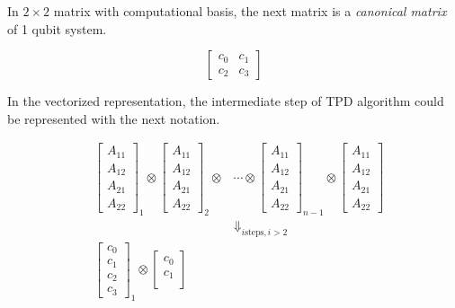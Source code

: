 \documentclass[twocolumn]{article}
\begin{document}
In $2 \times 2$ matrix with computational basis, the next matrix is a \textit{canonical matrix} of 1 qubit system.

\begin{equation}
    \begin{bmatrix}
        c_0 & c_1\\
        c_2 & c_3
    \end{bmatrix}
\end{equation}

In the vectorized representation, the intermediate step of TPD algorithm 
could be represented with the next notation. 

\begin{eqnarray}
    &\begin{bmatrix}
        A_{11} \\
        A_{12} \\
        A_{21} \\
        A_{22}
    \end{bmatrix}_1 \otimes
    \begin{bmatrix}
        A_{11} \\
        A_{12} \\
        A_{21} \\
        A_{22}
    \end{bmatrix}_2 \otimes
    &\cdots \otimes
    \begin{bmatrix}
        A_{11} \\
        A_{12} \\
        A_{21} \\
        A_{22}
    \end{bmatrix}_{n-1} \otimes
    \begin{bmatrix}
        A_{11} \\
        A_{12} \\
        A_{21} \\
        A_{22}
    \end{bmatrix}
    \nonumber\\
    & &\Downarrow_{i \text{steps}, i>2} \label{eq:vec_tpd}\\
    &\begin{bmatrix}
        c_0\\
        c_1\\
        c_2\\
        c_3
    \end{bmatrix}_1 \otimes
    \begin{bmatrix}
        c_0\\
        c_1\\

\end{bmatrix}
\end{eqnarray}
\end{document}
